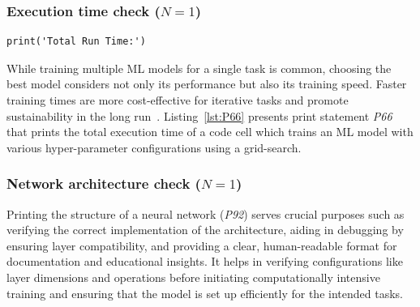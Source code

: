 
\subsubsection{Execution time check ($N = 1$)}
\begin{lstlisting}[caption={Print statement \emph{P66} used to check the total execution time of training an ML model with various hyper-parameter configurations.}, label={lst:P66}]
print('Total Run Time:')
\end{lstlisting}

While training multiple ML models for a single task is common, choosing the best model considers not only its performance but also its training speed. Faster training times are more cost-effective for iterative tasks and promote sustainability in the long run~\cite{shome2022data}. Listing~\ref{lst:P66} presents print statement \emph{P66} that prints the total execution time of a code cell which trains an ML model with various hyper-parameter configurations using a grid-search. 


\subsubsection{Network architecture check ($N = 1$)}

Printing the structure of a neural network (\emph{P92}) serves crucial purposes such as verifying the correct implementation of the architecture, aiding in debugging by ensuring layer compatibility, and providing a clear, human-readable format for documentation and educational insights. It helps in verifying configurations like layer dimensions and operations before initiating computationally intensive training and ensuring that the model is set up efficiently for the intended tasks.

